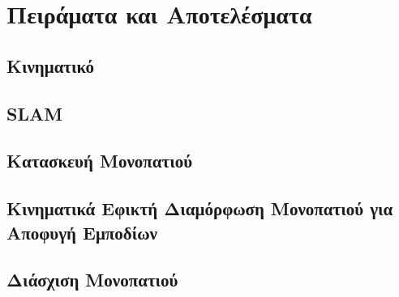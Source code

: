 
\chapter{Πειράματα και Αποτελέσματα} \label{Chapter5}


\section{Κινηματικό} \label{sec:kinematics_experiments}


\section{SLAM} \label{sec:slam_experiments}


\section{Κατασκευή Μονοπατιού} \label{sec:path_planning_experiments}


\section{Κινηματικά Εφικτή Διαμόρφωση Μονοπατιού για Αποφυγή Εμποδίων} \label{sec:obstacle_avoidance_experiments}


\section{Διάσχιση Μονοπατιού} \label{path_tracking_experiments}


